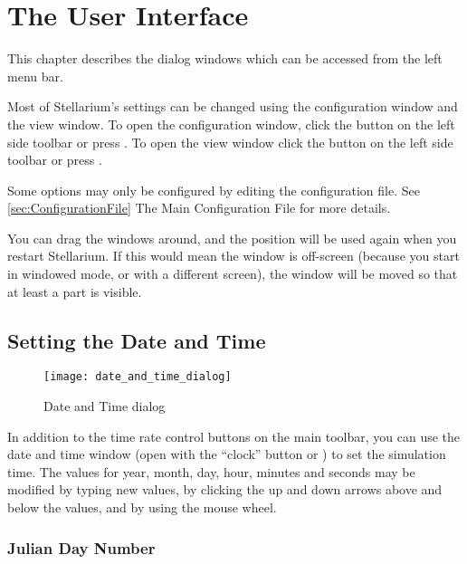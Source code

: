 

\chapter{The User Interface}
\label{ch:gui}


This chapter describes the dialog windows which can be accessed from the left menu bar.

Most of Stellarium's settings can be changed using the configuration
window and the view window. To open the configuration window, click the
button on the left side toolbar or press . To open the view window
click the button on the left side toolbar or press .

Some options may only be configured by editing the configuration file.
See \ref{sec:ConfigurationFile} The Main Configuration File for more
details.


 You can drag the
windows around, and the position will be used again when you restart
Stellarium. If this would mean the window is off-screen (because you
start in windowed mode, or with a different screen), the window will
be moved so that at least a part is visible.


\section{Setting the Date and Time}
\label{sec:gui:date}

\begin{figure}[h]
\centering\texttt{[image: date\_and\_time\_dialog]}
\caption{Date and Time dialog}
\label{fig:gui:date}
\end{figure}

In addition to the time rate control buttons on the main toolbar, you
can use the date and time window (open with the ``clock'' button or ) to set the simulation time. The values
for year, month, day, hour, minutes and seconds may be modified by
typing new values, by clicking the up and down arrows above and below
the values, and by using the mouse wheel.

\subsection{Julian Day Number}
\label{sec:gui:date:julian}

